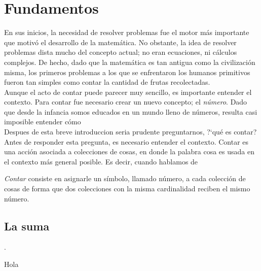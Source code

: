 \chapter{Fundamentos}

En sus inicios, la necesidad de resolver problemas fue el motor m\'as importante que motiv\'o el desarrollo de la matem\'atica. No obstante, la idea de resolver problemas dista mucho del concepto actual; no eran ecuaciones, ni c\'alculos complejos. De hecho, dado que la matem\'atica es tan antigua como la civilizaci\'on misma, los primeros problemas a los que se enfrentaron los humanos primitivos fueron tan simples como contar la cantidad de frutas recolectadas.\\

\noindent Aunque el acto de contar puede parecer muy sencillo, es importante entender el contexto. Para contar fue necesario crear un nuevo concepto; el \emph{n\'umero}.  Dado que desde la infancia somos educados en un mundo lleno de n\'umeros, resulta casi imposible entender c\'omo \\

\noindent Despu\-es de esta breve introducci\-on ser\-ia prudente preguntarnos, ?`qu\'e es contar? Antes de responder esta pregunta, es necesario entender el contexto. Contar es una acci\'on asociada a colecciones de cosas, en donde la palabra cosa es usada en el contexto m\'as general posible. Es decir, cuando hablamos de 

\begin{tcolorbox}
\emph{Contar} consiste en asignarle un s\'imbolo, llamado n\'umero, a cada colecci\'on de cosas de forma que dos colecciones con la misma cardinalidad reciben el mismo n\'umero.
\end{tcolorbox}

\section{La suma}

\noindent .

\begin{ex*}
Hola
\end{ex*}